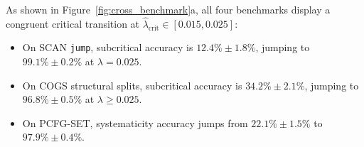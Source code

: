 \documentclass{article}
\theoremstyle{plain}
\theoremstyle{definition}
\begin{document}
As shown in Figure~\ref{fig:cross_benchmark}a, all four benchmarks display a congruent critical transition at $\hat{\lambda}_{\text{crit}} \in [0.015, 0.025]$:
\begin{itemize}[noitemsep]
    \item On SCAN \texttt{jump}, subcritical accuracy is $12.4\% \pm 1.8\%$, jumping to $99.1\% \pm 0.2\%$ at $\lambda = 0.025$.
    \item On COGS structural splits, subcritical accuracy is $34.2\% \pm 2.1\%$, jumping to $96.8\% \pm 0.5\%$ at $\lambda \ge 0.025$.
    \item On PCFG-SET, systematicity accuracy jumps from $22.1\% \pm 1.5\%$ to $97.9\% \pm 0.4\%$.
\end{itemize}

\begin{table}[t]
\centering
\caption{\textbf{Architecture Scaling \& Universality Summary (Tier 2 Screening, $n=10$ seeds per cell, plus Disaggregated Subcritical Baselines).} Performance across capacity scaling (Transformer 4L, 3.8M params) and recurrent non-attention inductive bias (GRU Seq2Seq 0.60M params, LSTM Seq2Seq 0.78M params). Subcritical baseline ($\lambda=0.00$) performance is disaggregated across all four benchmark suites (the previous $0.0\% \pm 0.0\%$ entry was an exact-match sequence filtering artifact on SCAN/PCFG splits).}
\label{tab:architecture_summary}
\vskip 0.1in
\begin{small}
\begin{sc}
\end{sc}
\end{small}
\end{table}
\end{document}

